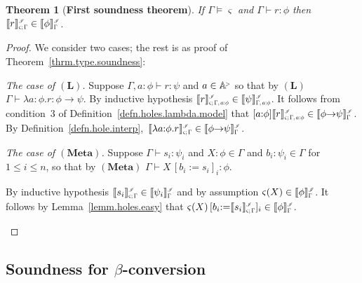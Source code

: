 \documentclass[submission,copyright]{eptcs}
\newtheorem{thrm}{Theorem}[section]
\newcommand{\lam}[1]{\lambda{#1}.}
\newcommand{\rulefont}[1]{\ensuremath{(\mathbf{#1})}}
\newcommand{\ssm}{:=}
\newcommand\fto{{\to}}
\newcommand\den[1]{{\hspace{.00ex}\scalebox{.55}{$#1$}}}
\newcommand{\idenot}[2]{\denot{\interp I}{#1}{#2}}
\newcommand\interp[1]{\ensuremath{\mathscr #1}}
\newcommand{\denot}[3]{\llbracket #3 \rrbracket_{\scalebox{.6}{$#2$}}^\den{#1}} \newcommand{\hdenot}[1]{\denot{\interp H}{}{#1}}
\newcommand\cent{\vdash}
\newcommand\ment{\vDash}
\newcommand\atomsup{\mathbb A^{\hspace{-.3ex}{}_{{}^>}\!}} \newcommand\basesort{\tau}
\begin{document}
\begin{thrm}[\bf First soundness theorem]
\label{thrm.hole.type.soundness}
If $\Gamma\ment\varsigma$ and $\Gamma\cent r:\phi$ then $\idenot{\varsigma;\Gamma}{r}\in\idenot{\Gamma}{\phi}$.
\end{thrm}
\begin{proof}
We consider two cases; the rest is as proof of Theorem~\ref{thrm.type.soundness}:
\begin{itemize*}
\item \emph{The case of \rulefont{L}.}\quad
Suppose $\Gamma,a{:}\phi\cent r:\psi$ and $a\in\atomsup$ so that by \rulefont{L} $\Gamma\cent\lam{a{:}\phi}r:\phi\fto\psi$.
By inductive hypothesis $\idenot{\varsigma;\Gamma,a{:}\phi}{r}\in\idenot{\Gamma,a{:}\phi}{\psi}$.
It follows from condition~3 of Definition~\ref{defn.holes.lambda.model}
that $[a{:}\phi]\idenot{\varsigma;\Gamma,a{:}\phi}{r}\in\idenot{\Gamma}{\phi\fto\psi}$.
By Definition~\ref{defn.hole.interp},\ $\idenot{\varsigma;\Gamma}{\lam{a{:}\phi}r}\in\idenot{\Gamma}{\phi\fto\psi}$.
\item \emph{The case of \rulefont{Meta}.}\quad
Suppose $\Gamma\cent s_i:\psi_i$ and $X{:}\phi\in\Gamma$ and $b_i{:}\psi_i\in\Gamma$ for $1{\leq}i{\leq}n$, so that by \rulefont{Meta} $\Gamma\cent X\,[b_i{\ssm}s_i]_i:\phi$.

By inductive hypothesis $\idenot{\varsigma;\Gamma}{s_i}\in\idenot{\Gamma}{\psi_i}$ and by assumption $\varsigma(X)\in\idenot{\Gamma}{\phi}$.
It follows by Lemma~\ref{lemm.holes.easy} that $\varsigma(X)\,[b_i{\ssm}\idenot{\varsigma;\Gamma}{s_i}]_i\in\idenot{\Gamma}{\phi}$. 
\qedhere\end{itemize*}
\end{proof}

 
\subsection{Soundness for $\beta$-conversion}
\end{document}
